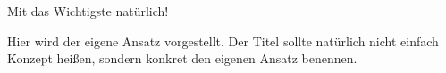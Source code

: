 Mit das Wichtigste natürlich!

Hier wird der eigene Ansatz vorgestellt. Der Titel sollte natürlich nicht einfach Konzept heißen, sondern konkret den eigenen Ansatz benennen.


%
